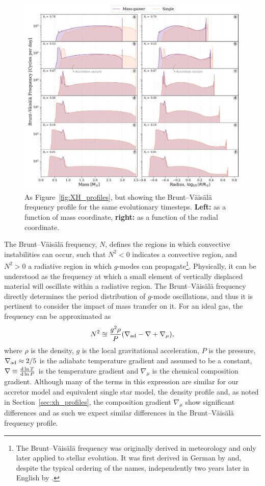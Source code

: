 \documentclass[twocolumn, twocolappendix, oneside]{aastex631}
\newcommand{\bvf}{Brunt–Väisälä frequency\xspace}
\newcommand{\gmode}{$g$-mode\xspace}
\newcommand{\gmodes}{$g$-modes\xspace}
\begin{document}
\begin{figure}
    \centering
    \includegraphics[width=\textwidth]{figures/BV_profile_all_combo.pdf}
    \caption{As Figure~\ref{fig:XH_profiles}, but showing the \bvf profile for the same evolutionary timesteps. \textbf{Left:} as a function of mass coordinate, \textbf{right:} as a function of the radial coordinate.}
    \label{fig:BV_profiles}
\end{figure}

The \bvf \citep{BVF-vaisala, BVF-brunt}, $N$, defines the regions in which convective instabilities can occur, such that $N^2 < 0$ indicates a convective region, and $N^2 > 0$ a radiative region in which \gmodes can propagate\footnote{The \bvf was originally derived in meteorology and only later applied to stellar evolution. It was first derived in German by \citet{BVF-vaisala} and, despite the typical ordering of the names, independently two years later in English by \citet{BVF-brunt}.}.
Physically, it can be understood as the frequency at which a small element of vertically displaced material will oscillate within a radiative region.
The \bvf directly determines the period distribution of \gmode oscillations, and thus it is pertinent to consider the impact of mass transfer on it. For an ideal gas, the frequency can be approximated as
\begin{equation}\label{eq:bvf}
    N^2 \approxeq \frac{g^2 \rho}{P} \qty(\nabla_{\rm ad} - \nabla + \nabla_\mu),
\end{equation}
where $\rho$ is the density, $g$ is the local gravitational acceleration, $P$ is the pressure, $\nabla_{\rm ad} \approx 2/5$ is the adiabatc temperature gradient and assumed to be a constant, $\nabla \equiv \dv{\ln T}{\ln P}$ is the temperature gradient and $\nabla_\mu$ is the chemical composition gradient. Although many of the terms in this expression are similar for our accretor model and equivalent single star model, the density profile and, as noted in Section~\ref{sec:xh_profiles}, the composition gradient $\nabla_\mu$ show significant differences and as such we expect similar differences in the \bvf profile.
\end{document}
